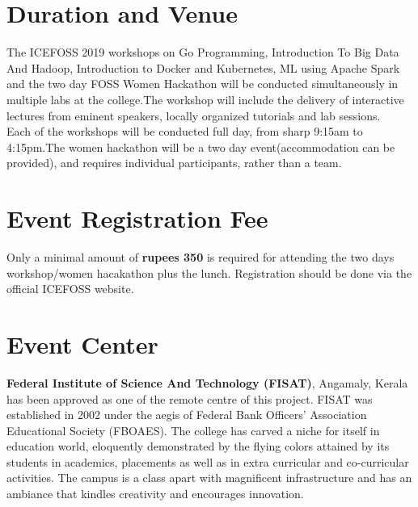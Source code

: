\documentclass[notuble,10pt,a4paper]{leaflet}
\begin{document}
\section{{\Large Duration and Venue}}
The ICEFOSS 2019 workshops on Go Programming, Introduction To Big Data And Hadoop, Introduction to Docker and Kubernetes, ML using Apache Spark and the two day FOSS Women Hackathon will be conducted simultaneously in multiple labs at the college.The workshop will include the delivery of interactive lectures from eminent speakers, locally organized tutorials and lab sessions.\\
Each of the workshops will be conducted full day, from sharp 9:15am to 4:15pm.The women hackathon will be a two day event(accommodation can be provided), and requires individual participants, rather than a team.

\section{{\Large Event Registration Fee}}

Only a minimal amount of \textbf{rupees 350}  is required for attending the two days workshop/women hacakathon plus the lunch. Registration should be done via the official ICEFOSS website.
\newpage




\section{{\Large Event Center}}
\textbf{Federal Institute of Science And Technology (FISAT)}, Angamaly, Kerala has been approved as one of the remote centre of this project. FISAT was established in 2002 under the aegis of Federal Bank Officers' Association Educational Society (FBOAES). The college has carved a niche for itself in education world, eloquently demonstrated by the flying colors attained by its students in academics, placements as well as in extra curricular and co-curricular activities. The campus is a class apart with magnificent infrastructure and has an ambiance that kindles creativity and encourages innovation.
\end{document}
